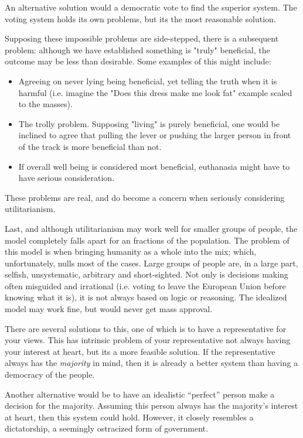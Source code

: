 \documentclass[12pt]{article}
\newcommand{\source}[1]{\footnote{\url{#1}}}
\let\footnote=\endnote
\begin{document}
An alternative solution would a democratic vote to find the superior system. The voting system holds its own problems, but its the most reasonable solution.

Supposing these impossible problems are side-stepped, there is a subsequent problem: although we have established something is "truly" beneficial, the outcome may be less than desirable. Some examples of this might include:

\begin{itemize}
    \item Agreeing on never lying being beneficial, yet telling the truth when it is harmful (i.e. imagine the "Does this dress make me look fat" example scaled to the masses).
    \item The trolly problem. Supposing "living" is purely beneficial, one would be inclined to agree that pulling the lever or pushing the larger person in front of the track is more beneficial than not.
    \item If overall well being is considered most beneficial, euthanasia might have to have serious consideration.
\end{itemize}

These problems are real, and do become a concern when seriously considering utilitarianism.

Last, and although utilitarianism may work well for smaller groups of people, the model completely falls apart for an fractions of the population. The problem of this model is when bringing humanity as a whole into the mix; which, unfortunately, nulls most of the cases. Large groups of people are, in a large part, selfish, unsystematic, arbitrary and short-sighted. Not only is decisions making often misguided and irrational (i.e. voting to leave the European Union before knowing what it is\source{http://fortune.com/2016/06/24/brexit-google-trends/}), it is not always based on logic or reasoning. The idealized model may work fine, but would never get mass approval.

There are several solutions to this, one of which is to have a representative for your views. This has intrinsic problem of your representative not always having your interest at heart, but its a more feasible solution. If the representative always has the \textit{majority} in mind, then it is already a better system than having a democracy of the people.

Another alternative would be to have an idealistic ``perfect'' person make a decision for the majority. Assuming this person always has the majority's interest at heart, then this system could hold. However, it closely resembles a dictatorship, a seemingly ostracized form of government.
\end{document}
